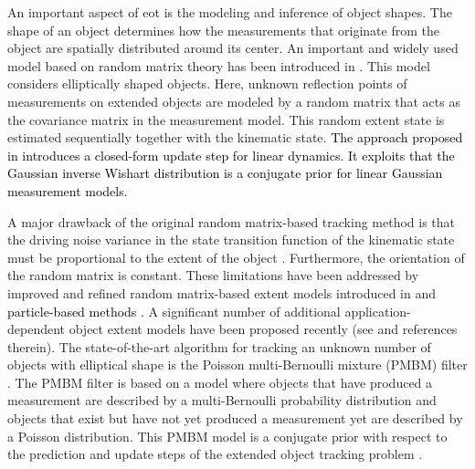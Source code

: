 \documentclass[10pt, twoside, romanappendices]{IEEEtran}
\providecommand{\rd}{\textcolor{black}}
\begin{document}
An important aspect of \ac{eot} is the modeling and inference of object shapes. The shape of an object determines how the measurements that originate from the object are spatially distributed around its center. An important and widely used model \cite{SchReuWan:C15,GraLunOrg:J12,BeaReuGraVoVoSch:J16,GraFatSve:J19,XiaGraSve:C19} based on random matrix theory has been introduced in \cite{Koc:J08}. This model considers elliptically shaped objects. Here, unknown reflection points of measurements on extended objects are modeled by a random matrix that acts as the covariance matrix in the measurement model. This random extent state is estimated sequentially together with the kinematic state. \rd{The approach proposed in \cite{Koc:J08} introduces a closed-form update step for linear dynamics. It exploits that the Gaussian inverse Wishart distribution is a conjugate prior for linear Gaussian measurement models.}

 A major drawback of the original random matrix-based tracking method is that the driving noise variance in the state transition function of the kinematic state must be proportional to the extent of the object \cite{Koc:J08}. Furthermore, the orientation of the random matrix is constant. These limitations have been addressed by improved and refined random matrix-based extent models introduced in \cite{FelFraKoc:J11,GraOrg:J14a,YanBau:J19} and \rd{particle-based methods \cite{VivGraBraWil:J17}.} 
 A significant number of additional application-dependent object extent models have been proposed recently (see \cite{GraBauReu:J17} and references therein). The state-of-the-art algorithm for tracking an unknown number of objects with elliptical shape is the Poisson multi-Bernoulli mixture (PMBM) filter \cite{GraFatSve:J19}. The PMBM filter is based on a  model \cite{Wil:J15} where objects that have produced a measurement are described by a multi-Bernoulli probability distribution and objects that exist but have not yet produced a measurement yet are described by a Poisson distribution. This PMBM model is a conjugate prior with respect to the prediction and update steps of the extended object tracking problem \cite{GraFatSve:J19}. 
\end{document}

